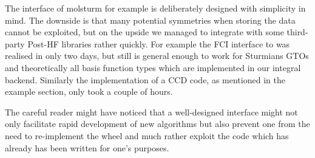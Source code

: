 


%
%
The \python interface of molsturm for example is deliberately designed
with simplicity in mind.
The downside is that many potential symmetries when storing the data
cannot be exploited,
but on the upside we managed to integrate \molsturm
with some third-party Post-HF libraries rather quickly.
For example the FCI interface to \pyscf was realised in only two days,
but still is general enough to work for Sturmians GTOs and theoretically
all basis function types which are implemented in our integral backend.
Similarly the implementation of a CCD code, as mentioned in the example section,
only took a couple of hours.

The careful reader might have noticed that a well-designed interface
might not only facilitate rapid development of new algorithms
but also prevent one from the need to re-implement the wheel
and much rather exploit the code which has already has been written
for one's purposes.

%
%
%

